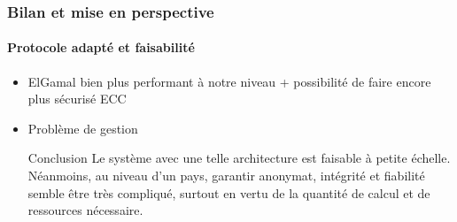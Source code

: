 \documentclass[10pt]{beamer}
\begin{document}
\begin{frame}
\frametitle{Bilan et mise en perspective}
\framesubtitle{Protocole adapté et faisabilité}
\begin{itemize}
\item ElGamal bien plus performant à notre niveau + possibilité de faire encore plus sécurisé ECC
\item Problème de gestion
\vspace{1cm}
\begin{block}{Conclusion}
Le système avec une telle architecture est faisable à petite échelle. Néanmoins, au niveau d'un pays, garantir anonymat, intégrité et fiabilité semble être très compliqué, surtout en vertu de la quantité de calcul et de ressources nécessaire.
\end{block}
\end{itemize}
\end{frame}
\end{document}
